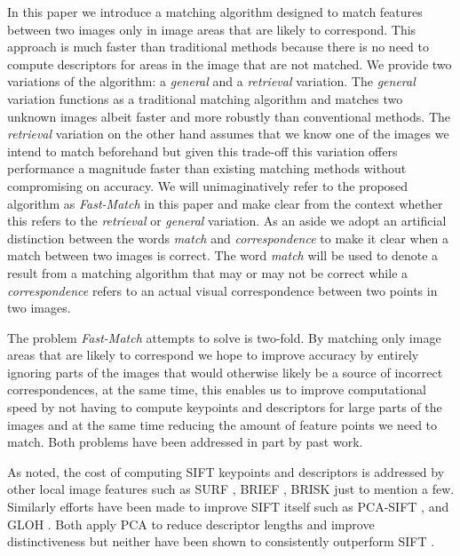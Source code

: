 \documentclass[runningheads]{llncs}
\begin{document}
In this paper we introduce a matching algorithm designed to match features between two images only in image areas that are likely to correspond. This approach is much faster than traditional methods because there is no need to compute descriptors for areas in the image that are not matched. We provide two variations of the algorithm: a \emph{general} and a \emph{retrieval} variation. The \emph{general} variation functions as a traditional matching algorithm and matches two unknown images albeit faster and more robustly than conventional methods. The \emph{retrieval} variation on the other hand assumes that we know one of the images we intend to match beforehand but given this trade-off this variation offers performance a magnitude faster than existing matching methods without compromising on accuracy. We will unimaginatively refer to the proposed algorithm as \emph{Fast-Match} in this paper and make clear from the context whether this refers to the \emph{retrieval} or \emph{general} variation. As an aside we adopt an artificial distinction between the words \emph{match} and \emph{correspondence} to make it clear when a match between two images is correct. The word \emph{match} will be used to denote a result from a matching algorithm that may or may not be correct while a \emph{correspondence} refers to an actual visual correspondence between two points in two images.

The problem \emph{Fast-Match} attempts to solve is two-fold. By matching only image areas that are likely to correspond we hope to improve accuracy by entirely ignoring parts of the images that would otherwise likely be a source of incorrect correspondences, at the same time, this enables us to improve computational speed by not having to compute keypoints and descriptors for large parts of the images and at the same time reducing the amount of feature points we need to match. Both problems have been addressed in part by past work. 

As noted, the cost of computing SIFT keypoints and descriptors is addressed by other local image features such as SURF \cite{bay2006surf}, BRIEF \cite{calonder2010brief}, BRISK \cite{leutenegger2011brisk} just to mention a few. Similarly efforts have been made to improve SIFT itself such as PCA-SIFT \cite{ke2004pca}, and GLOH \cite{mikolajczyk2005performance}. Both apply PCA to reduce descriptor lengths and improve distinctiveness but neither have been shown to consistently outperform SIFT 
\cite{mikolajczyk2005performance,li2008comprehensive}. 
\end{document}
